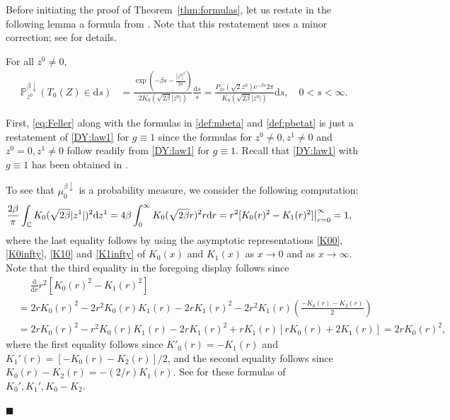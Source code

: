 \documentclass[12pt, twoside]{article}
\numberwithin{figure}{section}
\newcommand{\e}{{\mathrm e}}
\newcommand{\1}{\mathds 1}
\newcommand{\da}{{\downarrow}}
\renewcommand{\P}{{\mathbb P}}
\renewcommand{\d}{{\mathrm d}}
\newcommand{\2}{{\mathbf 1}}
\renewenvironment{proof}[1][\proofname]{\noindent {\bfseries #1.}\;}{\hfill\ensuremath{\blacksquare}\\}
\newcommand{\cc}{{^\circ}}
\newcommand{\two}{{\sqrt{2}}}
\begin{document}
Before initiating the proof of Theorem~\ref{thm:formulas}, let us restate in the following lemma a formula from \cite[the display below (2.9), p.884]{DY:Krein}. Note that this restatement uses a minor correction; see \cite[(5.10.25) on p.119]{Lebedev} for details. 

\begin{lem}\label{lem:BESQb1}
For all $z^0\neq 0$, 
\begin{align}
\P^{\beta\da}_{z^0}(T_0(Z)\in \d s)
&=\frac{\exp(-\beta s-\frac{|z^0|^2}{2s})}{2K_0(\sqrt{2\beta}|z^0|)}\frac{\d s}{s}
=\frac{ P_{2s}(\two z^0)\e^{-\beta s}2\pi}{K_0(\sqrt{2\beta}|z^0|)}\d s,\quad 0<s<\infty.\label{def:T0Z}
\end{align}
\end{lem}
\mbox{}


\begin{proof}[Proof of Theorem~\ref{thm:formulas}] \noindent {\bf (1$\cc$)} First, \eqref{eq:Feller} along with the formulas in \eqref{def:mbeta} and \eqref{def:pbetat}
is just a restatement of \eqref{DY:law1} for $g\equiv 1$ since the formulas for $z^0\neq 0,z^1\neq 0$ and $z^0=0,z^1\neq 0$ follow readily from \eqref{DY:law1} for $g\equiv 1$. Recall that \eqref{DY:law1} with $g\equiv 1$ has been obtained in \cite[Theorem~2.10]{C:BES}. 

 To see that $\mu_0^{\beta\da}$ is a probability measure, we consider the following computation:
\begin{align*}
\frac{2\beta}{\pi}\int_{\Bbb C}K_0(\sqrt{2\beta}|z^1|)^2 \d z^1&=
4\beta \int_0^\infty K_0(\sqrt{2\beta}r)^2r\d r
=r^2[K_0(r)^2-K_1(r)^2]\big|_{r=0}^\infty =1,
\end{align*}
where the last equality follows by using the asymptotic representations \eqref{K00}, \eqref{K0infty}, \eqref{K10} and \eqref{K1infty} of $K_0(x)$ and $K_1(x)$ as $x\to 0$ and as $x\to\infty$. Note that the third equality in the foregoing display follows since 
\begin{align*}
&\quad\;\frac{\d}{\d r}r^2[K_0(r)^2-K_1(r)^2]\\
&=2rK_0(r)^2-2r^2K_0(r)K_1(r)-2rK_1(r)^2-2r^2K_1(r)\left(\frac{-K_0(r)-K_2(r)}{2}\right)
\\
&=2rK_0(r)^2-r^2K_0(r)K_1(r)-2rK_1(r)^2+rK_1(r)[rK_0(r)+2K_1(r)]
=2rK_0(r)^2,
\end{align*}
where the first equality follows since $K'_0(r)=-K_1(r)$ and $K_1'(r)=[-K_0(r)-K_2(r)]/2$, and the second equality follows since $K_0(r)-K_2(r)=-(2/r)K_1(r)$. See \cite[(5.7.9) on p.110]{Lebedev} for these formulas of $K_0',K_1',K_0-K_2$.


\end{proof}
\end{document}
